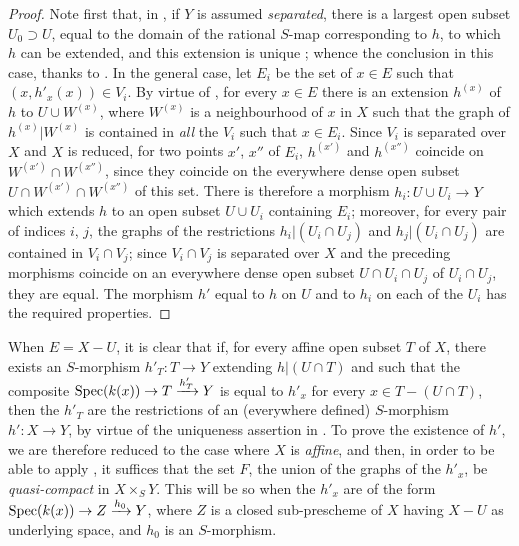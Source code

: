 \begin{proof}
Note first that, in , if $Y$ is assumed \emph{separated}, there is a largest open subset $U_0\supset U$, equal to the domain of the rational $S$-map corresponding to $h$, to which $h$ can be extended, and this extension is unique ; whence the conclusion in this case, thanks to .
In the general case, let $E_i$ be the set of $x\in E$ such that $(x,h'_x(x))\in V_i$.
By virtue of , for every $x\in E$ there is an extension $h^{(x)}$ of $h$ to $U\cup W^{(x)}$, where $W^{(x)}$ is a neighbourhood of $x$ in $X$ such that the graph of $h^{(x)}|W^{(x)}$ is contained in \emph{all} the $V_i$ such that $x\in E_i$.
Since $V_i$ is separated over $X$ and $X$ is reduced, for two points $x'$, $x''$ of $E_i$, $h^{(x')}$ and $h^{(x'')}$ coincide on $W^{(x')}\cap W^{(x'')}$, since they
coincide on the everywhere dense open subset $U\cap W^{(x')}\cap W^{(x'')}$ of this set.
There is therefore a morphism $h_i:U\cup U_i\to Y$ which extends $h$ to an open subset $U\cup U_i$ containing $E_i$; moreover, for every pair of indices $i$, $j$, the graphs of the restrictions $h_i|(U_i\cap U_j)$ and $h_j|(U_i\cap U_j)$ are contained in $V_i\cap V_j$; since $V_i\cap V_j$ is separated over $X$ and the preceding morphisms coincide on an everywhere dense open subset $U\cap U_i\cap U_j$ of $U_i\cap U_j$, they are equal.
The morphism $h'$ equal to $h$ on $U$ and to $h_i$ on each of the $U_i$ has the required properties.
\end{proof}

\begin{remark}[20.4.8]
\label{IV.20.4.8}
When $E=X-U$, it is clear that if, for every affine open subset $T$ of $X$, there exists an $S$-morphism $h'_T:T\to Y$ extending $h|(U\cap T)$ and such that the composite $\operatorname{Spec}(k(x))\to T\xrightarrow{h'_T}Y$ is equal to $h'_x$ for every $x\in T-(U\cap T)$, then the $h'_T$ are the restrictions of an (everywhere defined) $S$-morphism $h':X\to Y$, by virtue of the uniqueness assertion in .
To prove the existence of $h'$, we are therefore reduced to the case where $X$ is \emph{affine}, and then, in order to be able to apply , it suffices that the set $F$, the union of the graphs of the $h'_x$, be \emph{quasi-compact} in $X\times_S Y$.
This will be so when the $h'_x$ are of the form $\operatorname{Spec}(k(x))\to Z\xrightarrow{h_0}Y$, where $Z$ is a closed sub-prescheme of $X$ having $X-U$ as underlying space, and $h_0$ is an $S$-morphism.
\end{remark}

